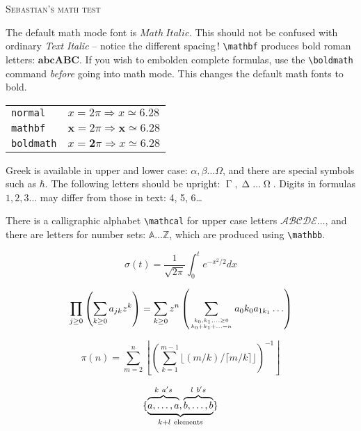\documentclass{article}
\begin{document}
\begin{center}
\scshape\Large Sebastian's math test
\end{center}
The default math mode font is $Math\ Italic$. This should not be
confused with ordinary \emph{Text Italic} -- notice the different spacing\,!
\verb|\mathbf| produces bold roman letters: $ \mathbf{abcABC} $.
If you wish to embolden complete formulas,
use the \verb|\boldmath| command \emph{before} going into math mode.
This changes the default math fonts to bold.

\begin{tabular}{ll}
\texttt{normal}   & $ x = 2\pi \Rightarrow x \simeq 6.28 $\\
\texttt{mathbf}   & $\mathbf{x} = 2\pi \Rightarrow \mathbf{x} \simeq 6.28 $\\
\texttt{boldmath} & {\boldmath $x = \mathbf{2}\pi \Rightarrow x
                    \simeq{\mathbf{6.28}}              $}\\
\end{tabular}
\smallskip

Greek is available in upper and lower case:
$\alpha,\beta \dots \Omega$, and there are special
symbols such as $ \hbar$.
The following letters should be upright: $\upGamma, \upDelta\dots \upOmega$.
Digits in formulas $1, 2, 3\dots$ may differ from those in text: 4, 5, 6\dots

There is a calligraphic alphabet \verb|\mathcal| for upper case letters
$ \mathcal{ABCDE}\dots $, and there are letters for number sets: $\mathbb{A\dots Z} $,
which are produced using \verb|\mathbb|.

\begin{equation}
  \sigma(t)=\frac{1}{\sqrt{2\pi}}
  \int^t_0 e^{-x^2/2} dx
\end{equation}

\begin{equation}
  \prod_{j\geq 0}
  \left(\sum_{k\geq 0}a_{jk} z^k\right)
= \sum_{k\geq 0} z^n
  \left( \sum_{{k_0,k_1,\ldots\geq 0}
          \atop{k_0+k_1+\ldots=n}    }
        a{_0k_0}a_{1k_1}\ldots  \right)
\end{equation}

\begin{equation}
\pi(n) = \sum_{m=2}^{n}
  \left\lfloor \left(\sum_{k=1}^{m-1}
       \lfloor(m/k)/\lceil m/k\rceil
       \rfloor \right)^{-1}
  \right\rfloor
\end{equation}

\begin{equation}
\{\underbrace{%
    \overbrace{\mathstrut a,\ldots,a}^{k\ a's},
    \overbrace{\mathstrut b,\ldots,b}^{l\ b's}}
  _{k+l\ \mathrm{elements}}                   \}
\end{equation}
\end{document}
